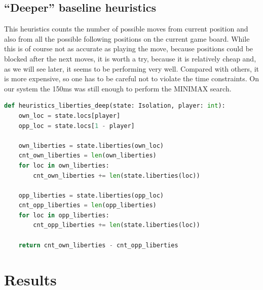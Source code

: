 \documentclass[aps,prd,notitlepage,floatfix,superscriptaddress,groupedaddress,nofootinbib]{revtex4-1}
\begin{document}
\subsection*{``Deeper'' baseline heuristics}
This heuristics counts the number of possible moves from current position and also from all the possible following positions on the current game board. While this is of course not as accurate as playing the move, because positions could be blocked after the next moves, it is worth a try, because it is relatively cheap and, as we will see later, it seems to be performing very well. Compared with others, it is more expensive, so one has to be careful not to violate the time constraints. On our system the 150ms was still enough to perform the MINIMAX search.

\begin{lstlisting}[language=python]
def heuristics_liberties_deep(state: Isolation, player: int):
    own_loc = state.locs[player]
    opp_loc = state.locs[1 - player]

    own_liberties = state.liberties(own_loc)
    cnt_own_liberties = len(own_liberties)
    for loc in own_liberties:
        cnt_own_liberties += len(state.liberties(loc))

    opp_liberties = state.liberties(opp_loc)
    cnt_opp_liberties = len(opp_liberties)
    for loc in opp_liberties:
        cnt_opp_liberties += len(state.liberties(loc))

    return cnt_own_liberties - cnt_opp_liberties
\end{lstlisting}

\section{Results}
\end{document}
